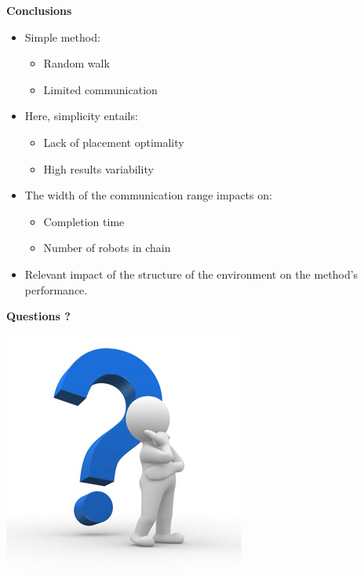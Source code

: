\begin{frame}[t,fragile]{\textbf{Conclusions}}
\begin{large}
\begin{itemize}
  \vskip10pt
  \item<1-> Simple method:
  \begin{itemize}
    \item Random walk
    \item Limited communication
  \end{itemize}
  \vskip10pt
  \item<2-> Here, simplicity entails:
  \begin{itemize}
    \item Lack of placement optimality
    \item High results variability
  \end{itemize}
  \vskip10pt
  \item<3-> The width of the communication range impacts on:
  \begin{itemize}
    \item Completion time
    \item Number of robots in chain
  \end{itemize}
  \vskip10pt
  \item<4-> Relevant impact of the structure of the environment on the method's performance.
\end{itemize}
\end{large}

\end{frame}
 

\begin{frame}[t,fragile]{\textbf{Questions ?}}
\begin{center}
\includegraphics[height=.8\textheight,keepaspectratio]{UlbLogos/Questions.jpg}
\end{center}
\end{frame}

